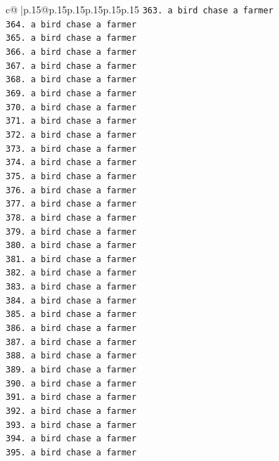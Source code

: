 \documentclass{article}
\begin{document}
{\begin{supertabular}{c@{$\;$}|p{.15\linewidth}@{}p{.15\linewidth}p{.15\linewidth}p{.15\linewidth}p{.15\linewidth}p{.15\linewidth}}
{{{\texttt{363. a bird chase a farmer} \\
\texttt{364. a bird chase a farmer} \\
\texttt{365. a bird chase a farmer} \\
\texttt{366. a bird chase a farmer} \\
\texttt{367. a bird chase a farmer} \\
\texttt{368. a bird chase a farmer} \\
\texttt{369. a bird chase a farmer} \\
\texttt{370. a bird chase a farmer} \\
\texttt{371. a bird chase a farmer} \\
\texttt{372. a bird chase a farmer} \\
\texttt{373. a bird chase a farmer} \\
\texttt{374. a bird chase a farmer} \\
\texttt{375. a bird chase a farmer} \\
\texttt{376. a bird chase a farmer} \\
\texttt{377. a bird chase a farmer} \\
\texttt{378. a bird chase a farmer} \\
\texttt{379. a bird chase a farmer} \\
\texttt{380. a bird chase a farmer} \\
\texttt{381. a bird chase a farmer} \\
\texttt{382. a bird chase a farmer} \\
\texttt{383. a bird chase a farmer} \\
\texttt{384. a bird chase a farmer} \\
\texttt{385. a bird chase a farmer} \\
\texttt{386. a bird chase a farmer} \\
\texttt{387. a bird chase a farmer} \\
\texttt{388. a bird chase a farmer} \\
\texttt{389. a bird chase a farmer} \\
\texttt{390. a bird chase a farmer} \\
\texttt{391. a bird chase a farmer} \\
\texttt{392. a bird chase a farmer} \\
\texttt{393. a bird chase a farmer} \\
\texttt{394. a bird chase a farmer} \\
\texttt{395. a bird chase a farmer} \\
}}}
\end{supertabular}}
\end{document}
